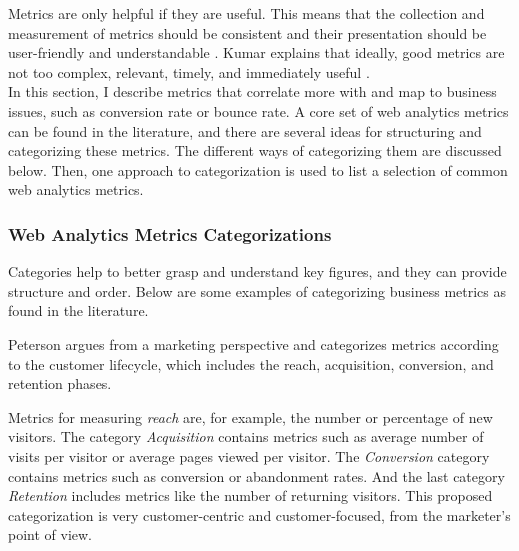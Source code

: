 

Metrics are only helpful if they are useful.
This means that the collection and measurement of metrics should be consistent and their presentation should be user-friendly and understandable \cite{2021MDNMeasuringPerformance}.
Kumar explains that ideally, good metrics are not too complex, relevant, timely, and immediately useful \cite{2012Kumar}. \\





In this section, I describe metrics that correlate more with and map to business issues, such as conversion rate or bounce rate.
A core set of web analytics metrics can be found in the literature, and there are several ideas for structuring and categorizing these metrics.
The different ways of categorizing them are discussed below.
Then, one approach to categorization is used to list a selection of common web analytics metrics.



\subsubsection{Web Analytics Metrics Categorizations} %

Categories help to better grasp and understand key figures, and they can provide structure and order.
Below are some examples of categorizing business metrics as found in the literature.

Peterson \cite{2004Peterson} argues from a marketing perspective and categorizes metrics according to the customer lifecycle, which includes the reach, acquisition, conversion, and retention phases.

Metrics for measuring \textit{reach} are, for example, the number or percentage of new visitors.
The category \textit{Acquisition} contains metrics such as average number of visits per visitor or average pages viewed per visitor.
The \textit{Conversion} category contains metrics such as conversion or abandonment rates.
And the last category \textit{Retention} includes metrics like the number of returning visitors.
This proposed categorization is very customer-centric and customer-focused, from the marketer's point of view. 

